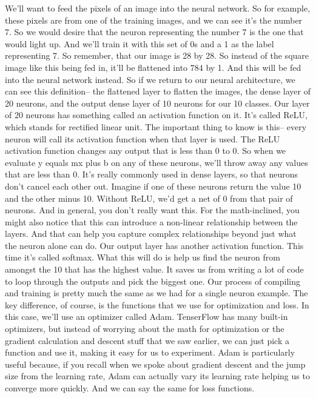 We'll want to feed the pixels of an image into the neural network.
So for example, these pixels are from one of the training images,
and we can see it's the number 7.
So we would desire that the neuron representing the number 7
is the one that would light up.
And we'll train it with this set of 0s and a 1 as the label representing 7.
So remember, that our image is 28 by 28.
So instead of the square image like this being fed in,
it'll be flattened into 784 by 1.
And this will be fed into the neural network instead.
So if we return to our neural architecture,
we can see this definition--
the flattened layer to flatten the images, the dense layer of 20 neurons,
and the output dense layer of 10 neurons for our 10 classes.
Our layer of 20 neurons has something called an activation function on it.
It's called ReLU, which stands for rectified linear unit.
The important thing to know is this--
every neuron will call its activation function when that layer is used.
The ReLU activation function changes any output that is less than 0 to 0.
So when we evaluate y equals mx plus b on any of these neurons,
we'll throw away any values that are less than 0.
It's really commonly used in dense layers,
so that neurons don't cancel each other out.
Imagine if one of these neurons return the value 10 and the other minus 10.
Without ReLU, we'd get a net of 0 from that pair of neurons.
And in general, you don't really want this.
For the math-inclined, you might also notice
that this can introduce a non-linear relationship between the layers.
And that can help you capture complex relationships beyond just
what the neuron alone can do.
Our output layer has another activation function.
This time it's called softmax.
What this will do is help us find the neuron from amongst the 10 that
has the highest value.
It saves us from writing a lot of code to loop through the outputs
and pick the biggest one.
Our process of compiling and training is pretty much the same
as we had for a single neuron example.
The key difference, of course, is the functions
that we use for optimization and loss.
In this case, we'll use an optimizer called Adam.
TenserFlow has many built-in optimizers, but instead
of worrying about the math for optimization
or the gradient calculation and descent stuff that we saw earlier,
we can just pick a function and use it, making it easy for us to experiment.
Adam is particularly useful because, if you
recall when we spoke about gradient descent and the jump size
from the learning rate, Adam can actually vary its learning rate
helping us to converge more quickly.
And we can say the same for loss functions.
